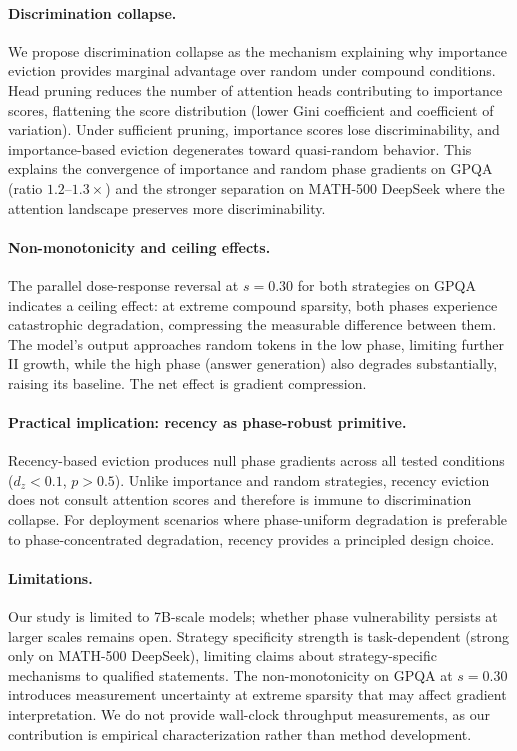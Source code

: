 \documentclass[11pt,a4paper]{article}
\begin{document}
\paragraph{Discrimination collapse.}
We propose discrimination collapse as the mechanism explaining why importance eviction provides marginal advantage over random under compound conditions. Head pruning reduces the number of attention heads contributing to importance scores, flattening the score distribution (lower Gini coefficient and coefficient of variation). Under sufficient pruning, importance scores lose discriminability, and importance-based eviction degenerates toward quasi-random behavior. This explains the convergence of importance and random phase gradients on GPQA (ratio $1.2$--$1.3\times$) and the stronger separation on MATH-500 DeepSeek where the attention landscape preserves more discriminability.

\paragraph{Non-monotonicity and ceiling effects.}
The parallel dose-response reversal at $s=0.30$ for both strategies on GPQA indicates a ceiling effect: at extreme compound sparsity, both phases experience catastrophic degradation, compressing the measurable difference between them. The model's output approaches random tokens in the low phase, limiting further II growth, while the high phase (answer generation) also degrades substantially, raising its baseline. The net effect is gradient compression.

\paragraph{Practical implication: recency as phase-robust primitive.}
Recency-based eviction produces null phase gradients across all tested conditions ($d_z < 0.1$, $p > 0.5$). Unlike importance and random strategies, recency eviction does not consult attention scores and therefore is immune to discrimination collapse. For deployment scenarios where phase-uniform degradation is preferable to phase-concentrated degradation, recency provides a principled design choice.

\paragraph{Limitations.}
Our study is limited to 7B-scale models; whether phase vulnerability persists at larger scales remains open. Strategy specificity strength is task-dependent (strong only on MATH-500 DeepSeek), limiting claims about strategy-specific mechanisms to qualified statements. The non-monotonicity on GPQA at $s=0.30$ introduces measurement uncertainty at extreme sparsity that may affect gradient interpretation. We do not provide wall-clock throughput measurements, as our contribution is empirical characterization rather than method development.
\end{document}
